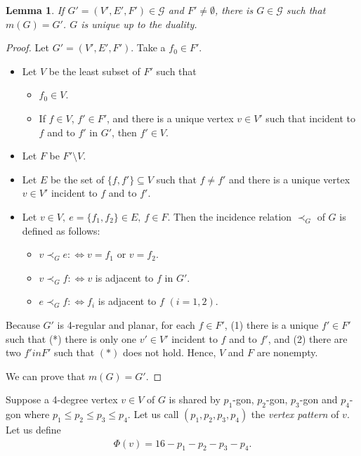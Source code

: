 \documentclass{amsart}
\newtheorem{lemma}{Lemma}
\def\G{\mathcal{G}}
\begin{document}
\begin{lemma}
If $G'=(V',E',F')\in\G$ and $F'\ne\emptyset$, there is  $G\in\G$ such
 that $m(G)=G'$. $G$ is unique up to the duality.
\end{lemma}
     \begin{proof} Let $G'=(V',E',F')$. Take a $f_0\in F'$.
      \begin{itemize}
       \item
     Let $V$ be the
    least subset of $F'$ such that
    \begin{itemize}
     \item $f_0\in V$.
     \item If $f\in V$, $f'\in F'$, and there is a unique vertex $v\in
	   V'$ such that incident to
	   $f$ and to $f'$ in $G'$, then $f'\in V$.
    \end{itemize}

       \item
	     Let $F$ be $F'\setminus V$.

       \item Let $E$ be the set of
$\{f, f'\}\subseteq V$ such that $f\ne f'$ and there is a unique vertex
    $v\in V'$ incident to $f$ and to $f'$.

       \item Let $v\in V, \ e=\{f_1,f_2\}\in E,\ f \in F$. Then the
	     incidence relation $\prec_G$ of $G$ is defined as follows:
	     \begin{itemize}
	      \item $v\prec_G e:\iff v=f_1$ or $v=f_2$.
	      \item $v\prec_G f:\iff v$ is adjacent to $f$ in $G'$.
	      \item $e\prec_G f:\iff f_i$ is adjacent to $f$ $(i=1,2)$.
	     \end{itemize}
      \end{itemize}

      Because $G'$ is 4-regular and planar, for each $f\in F'$, (1) there is
      a unique $f'\in F'$ such that (*) there is only one $v'\in V'$ incident
      to $f$ and to $f'$, and (2) there are two $f'in F'$ such that
      $(*)$ does not hold. Hence, $V$ and $F$ are nonempty.

      We can prove that $m(G)=G'$.





 \end{proof}

Suppose a 4-degree vertex $v\in V$ of $G$ is shared by
 $p_1$-gon, $p_2$-gon, $p_3$-gon and $p_4$-gon where $p_1\le p_2\le
 p_3\le p_4$. Let us call $(p_1,p_2,p_3,p_4)$ the \emph{vertex pattern}
 of $v.$ Let us define
 \begin{align}
  \Phi(v)=16 - p_1 - p_2 - p_3 - p_4. \label{fc}
 \end{align}
\end{document}
